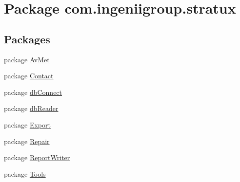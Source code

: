 \hypertarget{namespacecom_1_1ingeniigroup_1_1stratux}{}\section{Package com.\+ingeniigroup.\+stratux}
\label{namespacecom_1_1ingeniigroup_1_1stratux}
\subsection*{Packages}
\begin{DoxyCompactItemize}
\item 
package \hyperlink{namespacecom_1_1ingeniigroup_1_1stratux_1_1_av_met}{Av\+Met}
\item 
package \hyperlink{namespacecom_1_1ingeniigroup_1_1stratux_1_1_contact}{Contact}
\item 
package \hyperlink{namespacecom_1_1ingeniigroup_1_1stratux_1_1db_connect}{db\+Connect}
\item 
package \hyperlink{namespacecom_1_1ingeniigroup_1_1stratux_1_1db_reader}{db\+Reader}
\item 
package \hyperlink{namespacecom_1_1ingeniigroup_1_1stratux_1_1_export}{Export}
\item 
package \hyperlink{namespacecom_1_1ingeniigroup_1_1stratux_1_1_repair}{Repair}
\item 
package \hyperlink{namespacecom_1_1ingeniigroup_1_1stratux_1_1_report_writer}{Report\+Writer}
\item 
package \hyperlink{namespacecom_1_1ingeniigroup_1_1stratux_1_1_tools}{Tools}
\end{DoxyCompactItemize}
